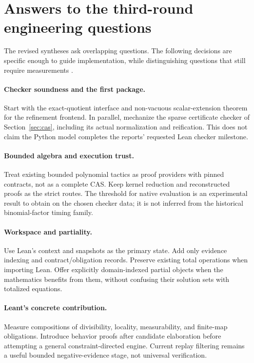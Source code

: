\documentclass[11pt,letterpaper]{article}
\theoremstyle{definition}\newtheorem{definition}[theorem]{Definition}
\begin{document}
\section{Answers to the third-round engineering questions}\label{sec:answers}
The revised syntheses ask overlapping questions. The following decisions are specific enough to guide implementation, while distinguishing questions that still require measurements \cite{reportA,reportB}.

\paragraph{Checker soundness and the first package.}
Start with the exact-quotient interface and non-vacuous scalar-extension theorem for the refinement frontend. In parallel, mechanize the sparse certificate checker of Section~\ref{sec:cas}, including its actual normalization and reification. This does not claim the Python model completes the reports' requested Lean checker milestone.

\paragraph{Bounded algebra and execution trust.}
Treat existing bounded polynomial tactics as proof providers with pinned contracts, not as a complete CAS. Keep kernel reduction and reconstructed proofs as the strict routes. The threshold for native evaluation is an experimental result to obtain on the chosen checker data; it is not inferred from the historical binomial-factor timing family.

\paragraph{Workspace and partiality.}
Use Lean's context and snapshots as the primary state. Add only evidence indexing and contract/obligation records. Preserve existing total operations when importing Lean. Offer explicitly domain-indexed partial objects when the mathematics benefits from them, without confusing their solution sets with totalized equations.

\paragraph{Leant's concrete contribution.}
Measure compositions of divisibility, locality, measurability, and finite-map obligations. Introduce behavior proofs after candidate elaboration before attempting a general constraint-directed engine. Current replay filtering remains a useful bounded negative-evidence stage, not universal verification.
\end{document}
